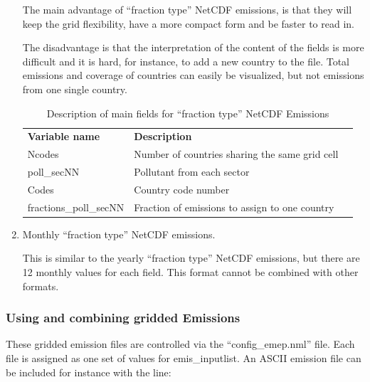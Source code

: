 \documentclass[a4paper,12pt]{report}
\begin{document}
\begin{enumerate}
The main advantage of ``fraction type'' NetCDF emissions, is that they
will keep the grid flexibility, have a more compact form and be faster
to read in. 

The disadvantage is that the interpretation of the content of the
fields is more difficult and it is hard, for instance, to add a new
country to the file. Total emissions and coverage of countries can
easily be visualized, but not emissions from one single country. 



\begin{table}
\caption{Description of main fields for ``fraction type'' NetCDF Emissions}
\label{Tab:Emisdata}
\begin{center}
\begin{tabular}{lll}
\hline

{\bf Variable name } & {\bf Description}\\

Ncodes & Number of countries sharing the same grid cell\\
poll\_secNN & Pollutant from each sector \\
Codes & Country code number \\
fractions\_poll\_secNN & Fraction of emissions to assign to one country\\

\hline

\end{tabular}
\end{center}
\end{table}





\item Monthly ``fraction type'' NetCDF emissions.

This is similar to the yearly ``fraction type'' NetCDF emissions, but
there are 12 monthly values for each field. This format cannot be
combined with other formats. 

\end{enumerate}

\subsubsection{Using and combining gridded Emissions}

These gridded emission files are controlled via the ``config\_emep.nml'' file.
Each file is assigned as one set of values for emis\_inputlist.
An ASCII emission file can be included for instance with the line:
\end{document}
